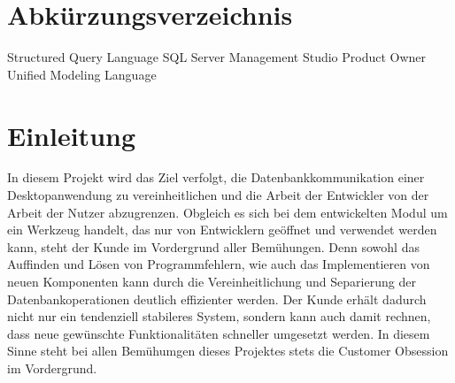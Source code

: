 \documentclass[11pt,toc=sectionentrywithoutdots, 
headheight=44pt, headings=optiontoheadandtoc, hyperfootnotes=false, hypertexnames=false]{scrartcl}
\begin{document}
\tableofcontents


\setcounter{secnumdepth}{0}

\newpage

{}
\listoffigures





{}
\listoftables


\section{Abkürzungsverzeichnis}


\begin{acronym}[xxxxxxx]

 {Structured Query Language}
 {SQL Server Management Studio}
 {Product Owner}
 {Unified Modeling Language}

\end{acronym}

{}
\printglossary[nonumberlist]
\newpage


\setcounter{secnumdepth}{1}
\setcounter{secnumdepth}{4}

\section{Einleitung}
In diesem Projekt wird das Ziel verfolgt, die Datenbankkommunikation einer Desktopanwendung zu vereinheitlichen und die Arbeit der Entwickler von der Arbeit der Nutzer abzugrenzen. Obgleich es sich bei dem entwickelten Modul um ein Werkzeug handelt, das nur von Entwicklern geöffnet und verwendet werden kann, steht der Kunde im Vordergrund aller Bemühungen. Denn sowohl das Auffinden und Lösen von Programmfehlern, wie auch das Implementieren von neuen Komponenten kann durch die Vereinheitlichung und Separierung der Datenbankoperationen deutlich effizienter werden. Der Kunde erhält dadurch nicht nur ein tendenziell stabileres System, sondern kann auch damit rechnen, dass neue gewünschte Funktionalitäten schneller umgesetzt werden. In diesem Sinne steht bei allen Bemühumgen dieses Projektes stets die \gls{Customer Obsession} im Vordergrund.
\end{document}
